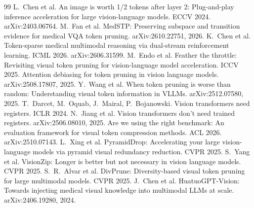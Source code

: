 \documentclass[11pt]{article}
\begin{document}
\begingroup\small
\begin{thebibliography}{99}
\setlength{\itemsep}{0pt}
 L.~Chen et al. An image is worth 1/2 tokens after layer 2: Plug-and-play
  inference acceleration for large vision-language models. ECCV 2024. arXiv:2403.06764.
 M.~Fan et al. MedSTP: Preserving subspace and transition evidence for medical
  VQA token pruning. arXiv:2610.22751, 2026.
 K.~Chen et al. Token-sparse medical multimodal reasoning via dual-stream
  reinforcement learning. ICML 2026. arXiv:2606.31599.
 M.~Endo et al. Feather the throttle: Revisiting visual token pruning for
  vision-language model acceleration. ICCV 2025.
 Attention debiasing for token pruning in vision language models.
  arXiv:2508.17807, 2025.
 Y.~Wang et al. When token pruning is worse than random: Understanding visual token
  information in VLLMs. arXiv:2512.07580, 2025.
 T.~Darcet, M.~Oquab, J.~Mairal, P.~Bojanowski. Vision transformers need
  registers. ICLR 2024.
 N.~Jiang et al. Vision transformers don't need trained registers.
  arXiv:2506.08010, 2025.
 Are we using the right benchmark: An evaluation framework for visual token
  compression methods. ACL 2026. arXiv:2510.07143.
 L.~Xing et al. PyramidDrop: Accelerating your large vision-language models via
  pyramid visual redundancy reduction. CVPR 2025.
 S.~Yang et al. VisionZip: Longer is better but not necessary in vision
  language models. CVPR 2025.
 S.~R.~Alvar et al. DivPrune: Diversity-based visual token pruning for large
  multimodal models. CVPR 2025.
 J.~Chen et al. HuatuoGPT-Vision: Towards injecting medical visual knowledge
  into multimodal LLMs at scale. arXiv:2406.19280, 2024.
\end{thebibliography}
\endgroup
\end{document}
